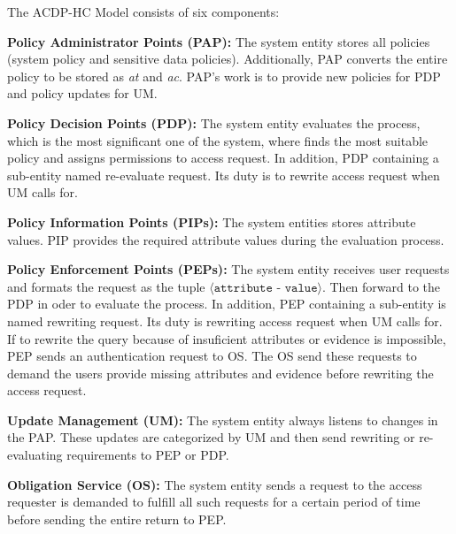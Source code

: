 \documentclass[conference]{IEEEtran}
\begin{document}
The ACDP-HC Model consists of six components:

\textbf{Policy Administrator Points (PAP): }The system entity stores all policies (system policy and sensitive data policies). 
Additionally, PAP converts the entire policy to be stored as \textit{at} and \textit{ac}. 
PAP's work is to provide new policies for PDP and policy updates for UM.

\textbf{Policy Decision Points (PDP): }The system entity evaluates the process, which is the most significant one of the system, where finds the most suitable policy and assigns permissions to access request. 
In addition, PDP containing a sub-entity named re-evaluate request. 
Its duty is to rewrite access request when UM calls for.

\textbf{Policy Information Points (PIPs): }The system entities stores attribute values. 
PIP provides the required attribute values during the evaluation process.

\textbf{Policy Enforcement Points (PEPs): }The system entity receives user requests and formats the request as the tuple $\langle \texttt{attribute - value} \rangle$.
Then forward to the PDP in oder to evaluate the process. 
In addition, PEP containing a sub-entity is named rewriting request. 
Its duty is rewriting access request when UM calls for. 
If to rewrite the query because of insuficient attributes or evidence is impossible, PEP sends an authentication request to OS.
The OS send these requests to demand the users provide missing attributes and evidence before rewriting the access request.

\textbf{Update Management (UM): }The system entity always listens to changes in the PAP. 
These updates are categorized by UM and then send rewriting or re-evaluating requirements to PEP or PDP.

\textbf{Obligation Service (OS): }The system entity sends a request to the access requester is demanded to fulfill all such requests for a certain period of time before sending the entire return to PEP.
\end{document}
